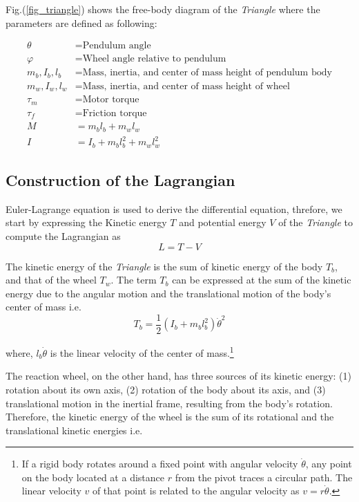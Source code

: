 \documentclass{article}
\begin{document}
Fig.(\ref{fig_triangle}) shows the free-body diagram of the \textit{Triangle} where the parameters are defined as following:

\begin{align*}
  \theta &= \text{Pendulum angle} \\
  \varphi &= \text{Wheel angle relative to pendulum} \\
  m_b, I_b, l_b &= \text{Mass, inertia, and center of mass height of pendulum body} \\
  m_w, I_w, l_w &= \text{Mass, inertia, and center of mass height of wheel} \\
  \tau_m &= \text{Motor torque} \\
  \tau_f &= \text{Friction torque} \\
  M &= m_b l_b + m_w l_w \\
  I &= I_b + m_b l_b^2 + m_w l_w^2
\end{align*}

\subsection{Construction of the Lagrangian}

Euler-Lagrange equation is used to derive the differential equation, threfore, we start by expressing the Kinetic energy $T$ and potential energy $V$ of the \textit{Triangle} to compute the Lagrangian as
\begin{equation}
  \label{eqn_lagrangian}
  L=T-V
\end{equation}

The kinetic energy of the \textit{Triangle} is the sum of kinetic energy of the body $T_{b}$, and that of the wheel $T_{w}$. The term $T_{b}$ can be expressed at the sum of the kinetic energy due to the angular motion and the translational motion of the body's center of mass i.e.
\begin{equation}
  T_b=\dfrac{1}{2}\left(I_{b} + m_{b} l_{b}^{2}\right)\dot{\theta}^{2}
\end{equation}

where, $l_{b}\dot{\theta}$ is the linear velocity of the center of mass.\footnote{If a rigid body rotates around a fixed point with angular velocity $\dot{\theta}$, any point on the body located at a distance $r$ from the pivot traces a circular path. The linear velocity $v$ of that point is related to the angular velocity as $v=r\dot{\theta}$.}

The reaction wheel, on the other hand, has three sources of its kinetic energy: (1) rotation about its own axis, (2) rotation of the body about its axis, and (3) translational motion in the inertial frame, resulting from the body's rotation. Therefore, the kinetic energy of the wheel is the sum of its rotational and the translational kinetic energies i.e.
\end{document}
